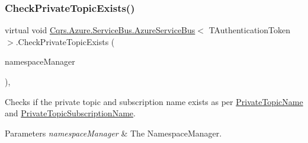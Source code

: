 \mbox{\label{classCqrs_1_1Azure_1_1ServiceBus_1_1AzureServiceBus_add2d99ff99f1af5470082b1de340c04a_add2d99ff99f1af5470082b1de340c04a}} 
\subsubsection{\texorpdfstring{Check\+Private\+Topic\+Exists()}{CheckPrivateTopicExists()}}
{\footnotesize\ttfamily virtual void \hyperlink{classCqrs_1_1Azure_1_1ServiceBus_1_1AzureServiceBus}{Cqrs.\+Azure.\+Service\+Bus.\+Azure\+Service\+Bus}$<$ T\+Authentication\+Token $>$.Check\+Private\+Topic\+Exists (\begin{DoxyParamCaption}\item[{Namespace\+Manager}]{namespace\+Manager }\end{DoxyParamCaption})\hspace{0.3cm}{\ttfamily [protected]}, {\ttfamily [virtual]}}



Checks if the private topic and subscription name exists as per \hyperlink{classCqrs_1_1Azure_1_1ServiceBus_1_1AzureServiceBus_a7af8ebcdd25672ff2252085637904f82_a7af8ebcdd25672ff2252085637904f82}{Private\+Topic\+Name} and \hyperlink{classCqrs_1_1Azure_1_1ServiceBus_1_1AzureServiceBus_a22498d51bba26c801b3b553fb451a6ae_a22498d51bba26c801b3b553fb451a6ae}{Private\+Topic\+Subscription\+Name}. 


\begin{DoxyParams}{Parameters}
{\em namespace\+Manager} & The Namespace\+Manager.\\
\hline
\end{DoxyParams}
\mbox{\label{classCqrs_1_1Azure_1_1ServiceBus_1_1AzureServiceBus_aae464d1d93ae6600ff5ace028160dd3c_aae464d1d93ae6600ff5ace028160dd3c}} 
